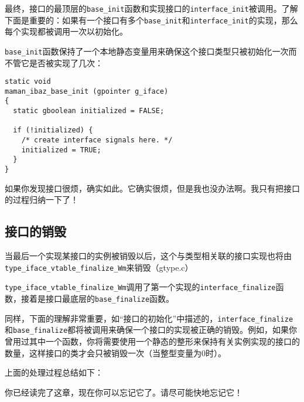 最终，接口的最顶层的\verb|base_init|函数和实现接口的\verb|interface_init|被调用。了解下面是重要的：如果有一个接口有多个\verb|base_init|和\verb|interface_init|的实现，那么每个实现都被调用一次以初始化。

\verb|base_init|函数保持了一个本地静态变量用来确保这个接口类型只被初始化一次而不管它是否被实现了几次：
\begin{verbatim}
static void
maman_ibaz_base_init (gpointer g_iface)
{
  static gboolean initialized = FALSE;

  if (!initialized) {
    /* create interface signals here. */
    initialized = TRUE;
  }
}
\end{verbatim}
如果你发现接口很烦，确实如此。它确实很烦，但是我也没办法啊。我只有把接口的过程归纳一下了！

\subsection{接口的销毁}

当最后一个实现某接口的实例被销毁以后，这个与类型相关联的接口实现也将由\verb|type_iface_vtable_finalize_Wm|来销毁（gtype.c）

\verb|type_iface_vtable_finalize_Wm|调用了第一个实现的\verb|interface_finalize|函数，接着是接口最底层的\verb|base_finalize|函数。

同样，下面的理解非常重要，如“接口的初始化”中描述的，\verb|interface_finalize|和\verb|base_finalize|都将被调用来确保一个接口的实现被正确的销毁。例如，如果你曾用过其中一个函数，你将需要使用一个静态的整形来保持有关实例实现的接口的数量，这样接口的类才会只被销毁一次（当整型变量为0时）。

上面的处理过程总结如下：

你已经读完了这章，现在你可以忘记它了。请尽可能快地忘记它！
